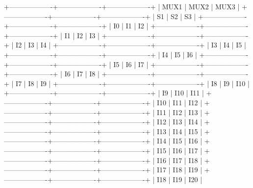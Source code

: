 +-------------------+-------------------+-------------------+
|       MUX1        |       MUX2        |       MUX3        |
+-------------------+-------------------+-------------------+
|       S1           |       S2           |       S3           |
+-------------------+-------------------+-------------------+
|       I0           |       I1           |       I2           |
+-------------------+-------------------+-------------------+
|       I1           |       I2           |       I3           |
+-------------------+-------------------+-------------------+
|       I2           |       I3           |       I4           |
+-------------------+-------------------+-------------------+
|       I3           |       I4           |       I5           |
+-------------------+-------------------+-------------------+
|       I4           |       I5           |       I6           |
+-------------------+-------------------+-------------------+
|       I5           |       I6           |       I7           |
+-------------------+-------------------+-------------------+
|       I6           |       I7           |       I8           |
+-------------------+-------------------+-------------------+
|       I7           |       I8           |       I9           |
+-------------------+-------------------+-------------------+
|       I8           |       I9           |       I10          |
+-------------------+-------------------+-------------------+
|       I9           |       I10          |       I11         |
+-------------------+-------------------+-------------------+
|       I10          |       I11          |       I12         |
+-------------------+-------------------+-------------------+
|       I11          |       I12          |       I13         |
+-------------------+-------------------+-------------------+
|       I12          |       I13          |       I14         |
+-------------------+-------------------+-------------------+
|       I13          |       I14          |       I15         |
+-------------------+-------------------+-------------------+
|       I14          |       I15          |       I16         |
+-------------------+-------------------+-------------------+
|       I15          |       I16          |       I17         |
+-------------------+-------------------+-------------------+
|       I16          |       I17          |       I18         |
+-------------------+-------------------+-------------------+
|       I17          |       I18          |       I19         |
+-------------------+-------------------+-------------------+
|       I18          |       I19          |       I20         |
